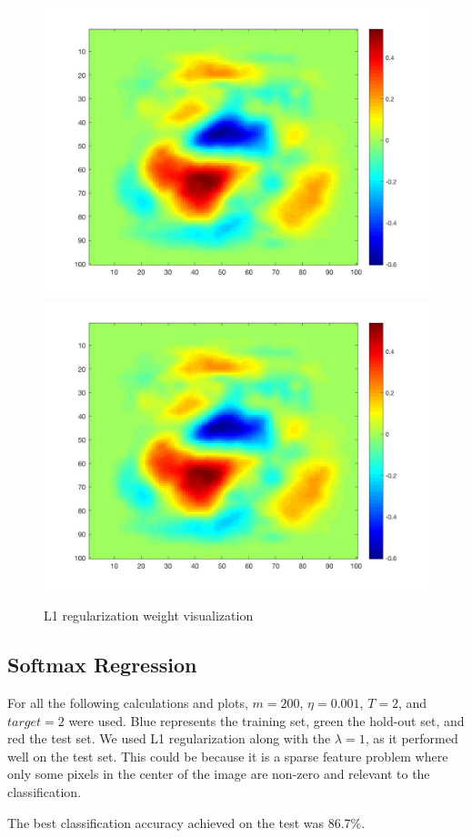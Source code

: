 \documentclass[11pt,twoside]{article}
\begin{document}
\begin{enumerate}[label=(\alph*)]
\begin{figure}[H]
  \includegraphics[width=0.45\columnwidth]{5e_4_l2}\\
  \includegraphics[width=0.45\columnwidth]{5e_5_l2}
  \centering
  \caption{L1 regularization weight visualization}
  \label{fig:5_e_l1}
  \end{figure}

\end{enumerate}
\subsection{Softmax Regression}

For all the following calculations and plots, $m = 200$, $\eta = 0.001$, $T = 2$, and $target = 2$ were used. Blue represents the training set, green the hold-out set, and red the test set. We used L1 regularization along with the $\lambda=1$, as it performed well on the test set. This could be because it is a sparse feature problem where only some pixels in the center of the image are non-zero and relevant to the classification.

The best classification accuracy achieved on the test was 86.7\%.\\
\end{document}
